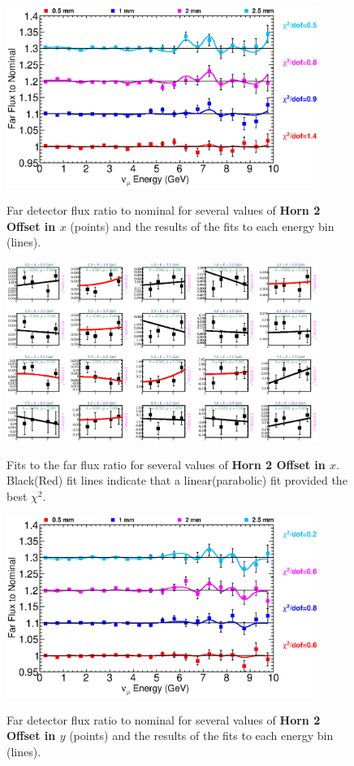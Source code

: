 \begin{figure}[ht]
  \begin{center}
    {\includegraphics[width=4.0in]{figures/Horn2XOffset_far_summary.eps}}
  \end{center}
\caption{ Far detector flux ratio to nominal for several values of {\bf Horn 2 Offset in $x$} (points) and the results of the fits to each energy bin (lines).}
\end{figure}

\begin{figure}[hb]
  \begin{center}
    {\includegraphics[width=4.0in]{figures/Horn2XOffset_far_fits.eps}}
  \end{center}
\caption{ Fits to the far flux ratio for several values of {\bf Horn 2 Offset in $x$}. Black(Red) fit lines indicate that a linear(parabolic) fit provided the best $\chi^2$. }
\end{figure}

\begin{figure}[ht]
  \begin{center}
    {\includegraphics[width=4.0in]{figures/Horn2YOffset_far_summary.eps}}
  \end{center}
\caption{ Far detector flux ratio to nominal for several values of {\bf Horn 2 Offset in $y$} (points) and the results of the fits to each energy bin (lines).}
\end{figure}

